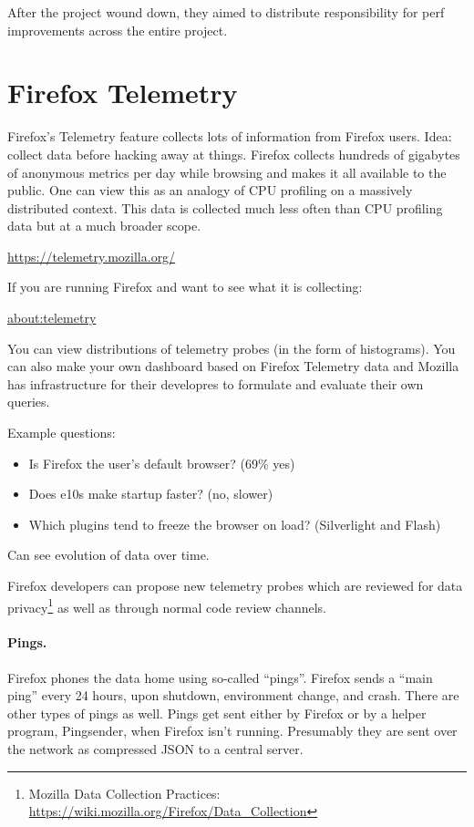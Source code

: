 \documentclass[a4paper]{report}
\begin{document}
After the project wound down, they aimed to distribute responsibility for perf improvements across the entire project.

\section*{Firefox Telemetry}
Firefox's Telemetry feature collects lots of information from Firefox
users.  Idea: collect data before hacking away at things.  Firefox collects hundreds of
gigabytes of anonymous metrics per day while browsing and makes it all available to
the public.  One can view this as an analogy of CPU profiling on a
massively distributed context. This data is collected much less often than
CPU profiling data but at a much broader scope.
\begin{center}
\url{https://telemetry.mozilla.org/}
\end{center}
If you are running Firefox and want to see what it is collecting:
\begin{center}
\url{about:telemetry}
\end{center}

You can view distributions of telemetry probes (in the form of
histograms). You can also make your own dashboard based on Firefox
Telemetry data and Mozilla has infrastructure for their developres to
formulate and evaluate their own queries.

Example questions:
\begin{itemize}[noitemsep]
\item Is Firefox the user's default browser? (69\% yes)
\item Does e10s make startup faster? (no, slower)
\item Which plugins tend to freeze the browser on load? (Silverlight and Flash)
\end{itemize}
Can see evolution of data over time.

Firefox developers can propose new telemetry probes which are reviewed
for data privacy\footnote{Mozilla Data Collection Practices: \url{https://wiki.mozilla.org/Firefox/Data_Collection}} as well as through normal code review channels.

\paragraph{Pings.} Firefox phones the data home using so-called ``pings''.
Firefox sends a ``main ping'' every 24 hours, upon shutdown, environment change,
and crash. There are other types of pings as well. Pings get sent either by Firefox
or by a helper program, Pingsender, when Firefox isn't running. Presumably they
are sent over the network as compressed JSON to a central server.
\end{document}
